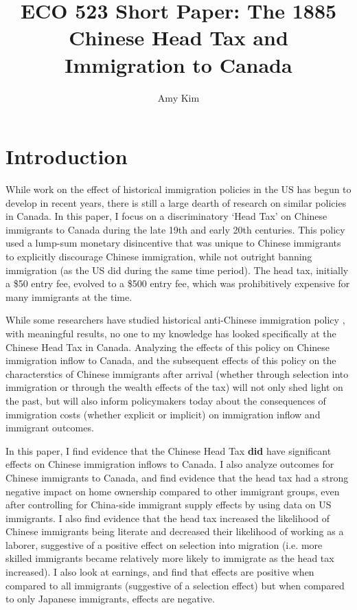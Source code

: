 \documentclass[12pt]{article}
\title{ECO 523 Short Paper: The 1885 Chinese Head Tax and Immigration to Canada}
\author{Amy Kim}
\begin{document}
\maketitle

\section{Introduction}
While work on the effect of historical immigration policies in the US has begun to develop in recent years, there is still a large dearth of research on similar policies in Canada. In this paper, I focus on a discriminatory `Head Tax' on Chinese immigrants to Canada during the late 19th and early 20th centuries. This policy used a lump-sum monetary disincentive that was unique to Chinese immigrants to explicitly discourage Chinese immigration, while not outright banning immigration (as the US did during the same time period). The head tax, initially a \$50 entry fee, evolved to a \$500 entry fee, which was prohibitively expensive for many immigrants at the time.

While some researchers have studied historical anti-Chinese immigration policy \citep{Chen2015, ChenXie2020, Postel2023}, with meaningful results, no one to my knowledge has looked specifically at the Chinese Head Tax in Canada. Analyzing the effects of this policy on Chinese immigration inflow to Canada, and the subsequent effects of this policy on the characterstics of Chinese immigrants after arrival (whether through selection into immigration or through the wealth effects of the tax) will not only shed light on the past, but will also inform policymakers today about the consequences of immigration costs (whether explicit or implicit) on immigration inflow and immigrant outcomes.

In this paper, I find evidence that the Chinese Head Tax \textbf{did} have significant effects on Chinese immigration inflows to Canada. I also analyze outcomes for Chinese immigrants to Canada, and find evidence that the head tax had a strong negative impact on home ownership compared to other immigrant groups, even after controlling for China-side immigrant supply effects by using data on US immigrants. 
I also find evidence that the head tax increased the likelihood of Chinese immigrants being literate and decreased their likelihood of working as a laborer, suggestive of a positive effect on selection into migration (i.e. more skilled immigrants became relatively more likely to immigrate as the head tax increased). I also look at earnings, and find that effects are positive when compared to all immigrants (suggestive of a selection effect) but when compared to only Japanese immigrants, effects are negative.
\end{document}
